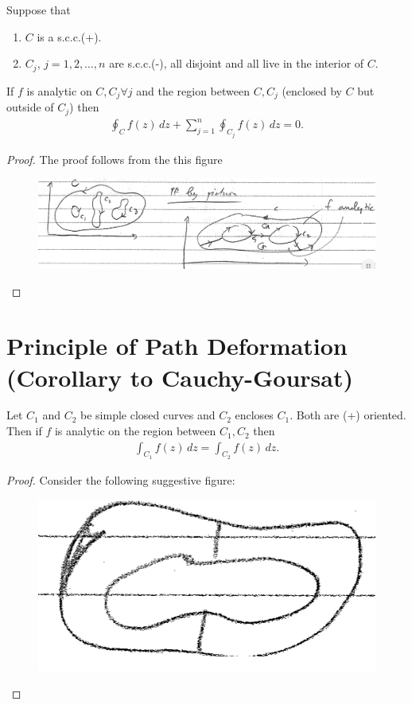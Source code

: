 \documentclass{article}
\theoremstyle{definition}
\begin{document}
Suppose that
\begin{enumerate}
	\item $C$ is a s.c.c.(+).
	\item $C_j$, $j=1,2,\dots,n$ are s.c.c.(-), all disjoint and all live in the interior of $C$.
\end{enumerate}
If $f$ is analytic on $C,C_j \forall j$ and the region between $C, C_j$ (enclosed by $C$ but outside of $C_j$) then 
\begin{align}
\oint_C f(z)\,dz + \sum^n_{j=1}\oint_{C_j}f(z)\,dz = 0.
\end{align}

\begin{proof}
	The proof follows from the this figure
	\begin{figure}[!htb]
		\centering
		\includegraphics[scale=0.25]{C-G-multi}
	\end{figure}


\end{proof}






\section{Principle of Path Deformation (Corollary to Cauchy-Goursat)}


Let $C_1$ and $C_2$ be simple closed curves and $C_2$ encloses $C_1$. Both are (+) oriented. Then if $f$ is analytic on the region between $C_1, C_2$ then
\begin{align}
\int_{C_1}f(z)\,dz = \int_{C_2}f(z)\,dz.
\end{align}

\begin{proof}
	Consider the following suggestive figure:
	
	
	\begin{figure}[!htb]
		\centering
		\includegraphics[scale=0.25]{deform}
	\end{figure}\qedhere
\end{proof}
\end{document}
